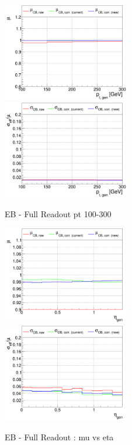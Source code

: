 \begin{figure}
\includegraphics[width=0.495\textwidth]{./ECAL_plots/plotsPU/EB/FULL/pdf/GENPT/EBFULL_GENPT_0100_0300_MuOverBins.pdf}
\includegraphics[width=0.495\textwidth]{./ECAL_plots/plotsPU/EB/FULL/pdf/GENPT/EBFULL_GENPT_0100_0300_EffSigmaOverBins.pdf}
\caption{EB - Full Readout pt 100-300}
\end{figure}

\begin{figure}
\includegraphics[width=0.495\textwidth]{./ECAL_plots/plotsPU/EB/FULL/pdf/GENETA/EBFULL_GENETA_0005_0020_MuOverBins.pdf}
\includegraphics[width=0.495\textwidth]{./ECAL_plots/plotsPU/EB/FULL/pdf/GENETA/EBFULL_GENETA_0005_0020_EffSigmaOverBins.pdf}
\caption{EB - Full Readout : mu vs eta}
\end{figure}

